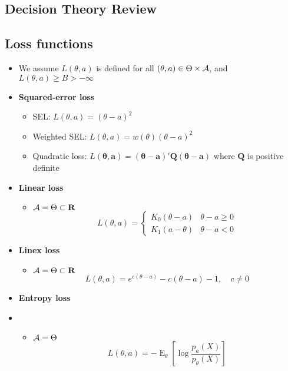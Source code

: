\documentclass[fontsize=5pt]{scrartcl}
\DeclareMathOperator{\E}{E}
\begin{document}
\begin{multicols}{2}
\section{Decision Theory Review}

\subsection{Loss functions}

\begin{itemize}
\item We assume $L(\theta, a)$ is defined for all $(\theta,a)
  \in \Theta\times {\cal A}$, and $L(\theta,a)\geq B>-\infty$
\item \textbf{Squared-error loss}
  \begin{itemize}
  \item SEL: $L(\theta,a) = (\theta-a)^{2}$
  \item Weighted SEL: $L(\theta,a) = w(\theta)(\theta-a)^{2}$
  \item Quadratic loss: $L(\bm\theta, \mathbf{a}) = (\bm\theta
    -\mathbf{a})'\mathbf{Q}(\bm\theta-\mathbf{a})$ where $\mathbf{Q}$
    is positive definite
  \end{itemize}
\item \textbf{Linear loss}
  \begin{itemize}
  \item ${\cal A} = \Theta\subset \mathbf{R}$
    \begin{equation}
      L(\theta,a) = \begin{cases} K_{0}(\theta-a) & \theta-a\geq 0 \\
        K_{1}(a-\theta) & \theta-a<0 \end{cases}
    \end{equation}
  \end{itemize}
\item \textbf{Linex loss}
  \begin{itemize}
  \item ${\cal A}=\Theta\subset\mathbf{R}$
    \begin{equation}
      L(\theta,a) = e^{c(\theta-a)}-c(\theta-a) -1,\quad c\neq 0
    \end{equation}
  \end{itemize}
\item \textbf{Entropy loss}
\item
  \begin{itemize}
  \item ${\cal A}=\Theta$
    \begin{equation}
      L(\theta,a) = - \E_{\theta}\left[\log \frac{p_{a}(X)}{p_{\theta}(X)}\right]
    \end{equation}


\end{itemize}
\end{itemize}
\end{multicols}
\end{document}
